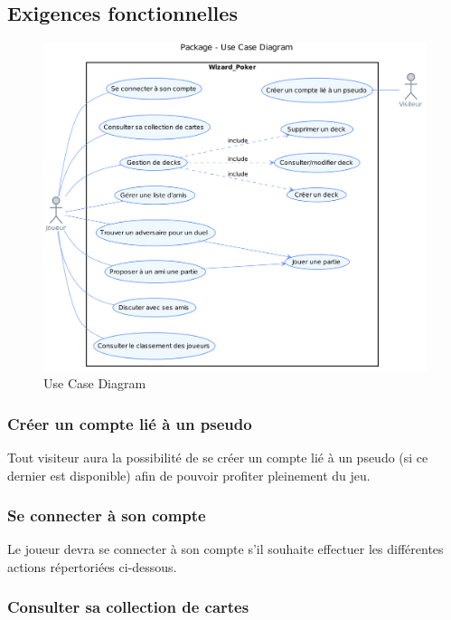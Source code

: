 \documentclass[11pt,a4paper]{article}
\begin{document}
\subsection{Exigences fonctionnelles}
\label{sec:exi-fonc}
\begin{figure}[ht]
  \centering
  \includegraphics[width=1\textwidth]{../uml_files/UseCaseDiagram.png}
  \caption{\label{fig:usecasebesoin} Use Case Diagram}
\end{figure}

\subsubsection*{Créer un compte lié à un pseudo}

Tout visiteur aura la possibilité de se créer un compte
lié à un pseudo (si ce dernier est disponible) afin de pouvoir
profiter pleinement du jeu.


\subsubsection*{Se connecter à son compte}

Le joueur devra se connecter à son compte s'il souhaite effectuer
les différentes actions répertoriées ci-dessous.


\subsubsection*{Consulter sa collection de cartes}
\end{document}
